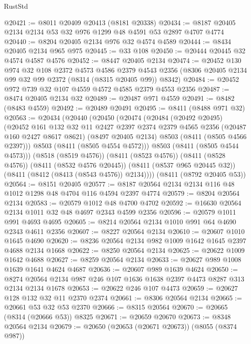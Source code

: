 \begin{lexlean}{RustStd}
\begin{coremodule}
@20421 := @8011 @20409 @20413 (@8181 @20338)
@20434 := @8187 @20405 @2134 @2134 @53 @32 @976 @1299 @48 @4591 @53 @2897 @4707 @4774
@20440 := @8204 @20405 @2134 @976 @32 @4574 @4589
@20444 := @8434 @20405 @2134 @965 @975
@20445 := @33 @108
@20450 := @20444 @20445 @32 @4574 @4587 @4576
@20452 := @8447 @20405 @2134
@20474 := @20452
    @130
    @974
    @32
    @108
    @2372
    @4573
    @4586
    @2379
    @4543
    @2356
    (@8306 @20405 @2134 @99 @32 @99 @2372 (@8314 (@8315 @20405 @99)) @8342)
@20484 := @20452 @972 @739 @32 @107 @4559 @4572 @4585 @2379 @4553 @2356
@20487 := @8474 @20405 @2134 @32
@20489 := @20487 @971 @4559
@20491 := @8482 (@8483 @4559)
@20492 := @20489 @20491
@20495 := @8411 (@8488 @971 @32)
@20563 := @20434
    (@20440
      (@20450
        (@20474
          (@20484
            (@20492 @20495)
            (@20452
              @161
              @132
              @32
              @11
              @2427
              @2397
              @2374
              @2379
              @4565
              @2356
              (@20487 @160 @2427 @8617 @8621)
              (@8497 @20405 @2134)
              @8503
              (@8411 (@8505 @4566 @2397)))
            @8503
            (@8411 (@8505 @4554 @4572)))
          @8503
          (@8411 (@8505 @4544 @4573)))
        (@8518 (@8519 @4576))
        (@8411 (@8523 @4576))
        (@8411 (@8528 @4576))
        (@8411 (@8532 @4576 @20445))
        (@8411 (@8537 @965 @20445 @32))
        (@8411 (@8412 (@8413 (@8543 @4576)) @2134))))
    (@8411 (@8792 @20405 @53))
@20564 := @8151 @20405
@20577 := @8187 @20564 @2134 @2134 @116 @48 @1012 @1298 @48 @4704 @116 @4594 @2397 @4774
@20579 := @8204 @20564 @2134
@20583 := @20579 @1012 @48 @4700 @4702
@20592 := @16630 @20564 @2134 @1011 @32 @48 @4697 @2343 @4599 @2356
@20596 := @20579 @1011 @991 @4693 @4695
@20605 := @8214 @20564 @2134 @1010 @991 @64 @4690 @2343 @4611 @2356
@20607 := @8227 @20564 @2134
@20610 := @20607 @1010 @1645 @4690
@20620 := @8236 @20564 @2134 @982 @1009 @1642 @1645 @2397 @4688 @2134 @1668
@20622 := @8250 @20564 @2134
@20625 := @20622 @1009 @1642 @4688
@20627 := @8259 @20564 @2134
@20633 := @20627 @989 @1008 @1639 @1641 @4624 @4687
@20636 := @20607 @989 @1639 @4624
@20650 := @8274 @20564 @2134 @987 @246 @107 @1636 @1638 @2397 @4473 @8287 @313 @2134 @2134 @1678
@20653 := @20622 @246 @107 @4473
@20659 := @20627 @128 @132 @32 @11 @2370 @2374
@20661 := @8306 @20564 @2134
@20665 := @20661 @53 @32 @53 @2370
@20666 := @8315 @20564
@20670 := @20665 (@8314 (@20666 @53)) @8325
@20671 := @20659 @20670
@20673 := @8348 @20564 @2134
@20679 := @20650 (@20653 (@20671 @20673)) (@8055 (@8374 @987))

\end{coremodule}
\end{lexlean}
